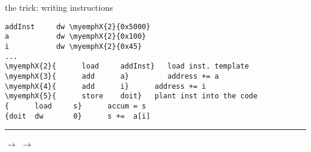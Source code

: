 \begin{frame}[fragile,label=theTrick]{the trick: writing instructions}
\providecommand{\myemphX}[2]{\myemph<#1>{#2}}
\begin{Verbatim}[commandchars=\\\{\}]
addInst     dw \myemphX{2}{0x5000}
a           dw \myemphX{2}{0x100}
i           dw \myemphX{2}{0x45}
...
\myemphX{2}{      load     addInst}   load inst. template
\myemphX{3}{      add      a}         address += a
\myemphX{4}{      add      i}      address += i
\myemphX{5}{      store    doit}   plant inst into the code
{      load     s}      accum = s
{doit  dw       0}      s +=  a[i]
\end{Verbatim}
\hrule
\vspace{1cm}
\large
{} $\rightarrow$  $\rightarrow$ 
\end{frame}

\providecommand{\connectBoxes}[3]{
\path[#1] (#2.south east) -- (#3.south west);
\path[#1] (#2.north east) -- (#3.north west);
}

